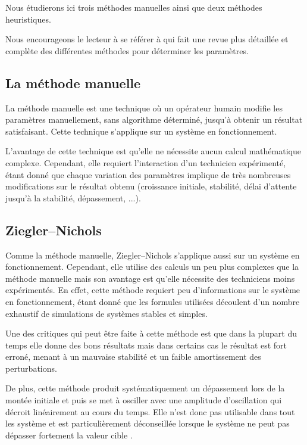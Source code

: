 \documentclass[a4paper,10pt]{report}
\begin{document}
Nous étudierons ici trois méthodes manuelles ainsi que deux méthodes heuristiques.

Nous encourageons le lecteur à se référer à \cite{shahrokhi2013comparison} qui fait une revue plus détaillée et complète des différentes méthodes pour déterminer les paramètres.


\subsection{La méthode manuelle}

La méthode manuelle est une technique où un opérateur humain modifie les paramètres manuellement, sans algorithme déterminé, jusqu'à obtenir un résultat satisfaisant. Cette technique s'applique sur un système en fonctionnement.

L'avantage de cette technique est qu'elle ne nécessite aucun calcul mathématique complexe. Cependant, elle requiert l'interaction d'un technicien expérimenté, étant donné que chaque variation des paramètres implique de très nombreuses modifications sur le résultat obtenu (croissance initiale, stabilité, délai d'attente jusqu'à la stabilité, dépassement, ...). \cite{zhong2006pid}


\subsection{Ziegler–Nichols}
Comme la méthode manuelle, Ziegler–Nichols s'applique aussi sur un système en fonctionnement. Cependant, elle utilise des calculs un peu plus complexes que la méthode manuelle mais son avantage est qu'elle nécessite des techniciens moins expérimentés.\cite{ziegler1942optimum}
En effet, cette méthode requiert peu d'informations sur le système en fonctionnement, étant donné que les formules utilisées découlent d'un nombre exhaustif de simulations de systèmes stables et simples. \cite{silva2007pid}

Une des critiques qui peut être faite à cette méthode est que dans la plupart du temps elle donne des bons résultats mais dans certains cas le résultat est fort erroné,
menant à un mauvaise stabilité et un faible amortissement des perturbations.

De plus, cette méthode produit systématiquement un dépassement lors de la montée initiale et
puis se met à osciller avec une amplitude d'oscillation qui décroit linéairement au cours du temps.
Elle n'est donc pas utilisable dans tout les système
 et est particulièrement déconseillée lorsque le système ne peut pas dépasser fortement la valeur cible \cite{silva2007pid}.
\end{document}
